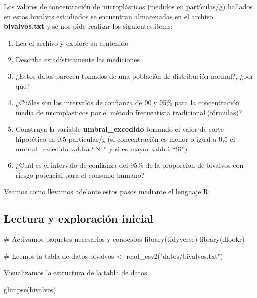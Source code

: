 \documentclass[
  spanish,
  a4paper,
]{scrbook}
\newenvironment{Shaded}{\begin{snugshade}}{\end{snugshade}}
\newcommand{\CommentTok}[1]{\textcolor[rgb]{0.37,0.37,0.37}{#1}}
\newcommand{\FunctionTok}[1]{\textcolor[rgb]{0.28,0.35,0.67}{#1}}
\newcommand{\NormalTok}[1]{\textcolor[rgb]{0.00,0.23,0.31}{#1}}
\newcommand{\OtherTok}[1]{\textcolor[rgb]{0.00,0.23,0.31}{#1}}
\newcommand{\StringTok}[1]{\textcolor[rgb]{0.13,0.47,0.30}{#1}}
\providecommand{\tightlist}{%
  \setlength{\itemsep}{0pt}\setlength{\parskip}{0pt}}
\begin{document}
Los valores de concentración de microplásticos (medidos en partículas/g)
hallados en estos bivalvos estudiados se encuentran almacenadas en el
archivo \textbf{bivalvos.txt} y se nos pide realizar los siguientes
items:

\begin{enumerate}
\def\labelenumi{\alph{enumi}.}
\tightlist
\item
  Lea el archivo y explore su contenido
\item
  Describa estadísticamente las mediciones
\item
  ¿Estos datos parecen tomados de una población de distribución normal?,
  ¿por qué?
\item
  ¿Cuáles son los intervalos de confianza de 90 y 95\% para la
  concentración media de microplasticos por el método frecuentista
  tradicional (fórmulas)?
\item
  Construya la variable \textbf{umbral\_excedido} tomando el valor de
  corte hipotético en 0,5 partículas/g (si concentración es menor o
  igual a 0,5 el umbral\_excedido valdrá ``No'' y si es mayor valdrá
  ``Si'')
\item
  ¿Cuál es el intervalo de confianza del 95\% de la proporcion de
  bivalvos con riesgo potencial para el consumo humano?
\end{enumerate}

Veamos como llevamos adelante estos pasos mediante el lenguaje R:

\subsection{Lectura y exploración
inicial}\label{lectura-y-exploraciuxf3n-inicial}

\begin{Shaded}
\begin{Highlighting}[]
\CommentTok{\# Activamos paquetes necesarios y conocidos}
\FunctionTok{library}\NormalTok{(tidyverse)}
\FunctionTok{library}\NormalTok{(dlookr)}

\CommentTok{\# Leemos la tabla de datos}
\NormalTok{bivalvos }\OtherTok{\textless{}{-}} \FunctionTok{read\_csv2}\NormalTok{(}\StringTok{"datos/bivalvos.txt"}\NormalTok{)}
\end{Highlighting}
\end{Shaded}

Visualizamos la estructura de la tabla de datos

\begin{Shaded}
\begin{Highlighting}[]
\FunctionTok{glimpse}\NormalTok{(bivalvos)}
\end{Highlighting}
\end{Shaded}
\end{document}

